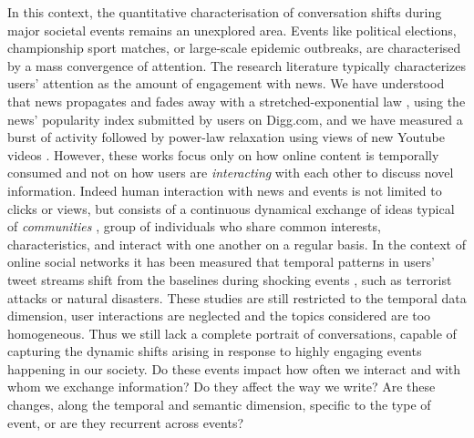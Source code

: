 \documentclass[fleqn,10pt]{wlscirep}
\begin{document}
In this context, the quantitative characterisation of conversation shifts during major societal events \cite{lorenz2022systematic} remains an unexplored area. 
Events like political elections, championship sport matches, or large-scale epidemic outbreaks, are characterised by a mass convergence of attention.
The research literature typically characterizes users' attention as the amount of engagement with news.
We have understood that news propagates and fades away with a stretched-exponential law \cite{wu2007novelty}, using the news' popularity index submitted by users on Digg.com, and we have measured a burst of activity followed by power-law relaxation using views of new Youtube videos \cite{crane2008robust,yang2011patterns}. 
However, these works focus only on how online content is temporally consumed and not on how users are \emph{interacting} with each other to discuss novel information.
%
Indeed human interaction with news and events is not limited to clicks or views, but consists of a continuous dynamical exchange of ideas typical of \emph{communities} \cite{candia2019universal}, group of individuals who share common interests, characteristics, and interact with one another on a regular basis.
In the context of online social networks it has been measured that temporal patterns in users' tweet streams shift from the baselines during shocking events \cite{sasahara2013quantifying,he2017measuring}, such as terrorist attacks or natural disasters. 
These studies are still restricted to the temporal data dimension, user interactions are neglected and the topics considered are too homogeneous.
Thus we still lack a complete portrait of conversations, capable of capturing the dynamic shifts arising in response to highly engaging events happening in our society. 
Do these events impact how often we interact and with whom we exchange information? 
Do they affect the way we write?
Are these changes, along the temporal and semantic dimension, specific to the type of event, or are they recurrent across events?
%
\end{document}

